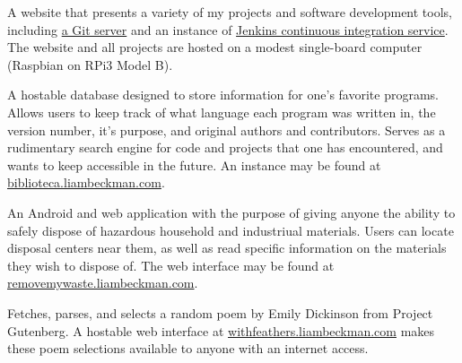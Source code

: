 A website that presents a variety of my projects and software development tools, including \href{https://git.liambeckman.com}{a Git server} and an instance of \href{https://liambeckman.com/jenkins}{Jenkins continuous integration service}. The website and all projects are hosted on a modest single-board computer (Raspbian on RPi3 Model B).

\myBreak


A hostable database designed to store information for one's favorite programs. Allows users to keep track of what language each program was written in, the version number, it’s purpose, and original authors and contributors. Serves as a rudimentary search engine for code and projects that one has encountered, and wants to keep accessible in the future. An instance may be found at \textcolor{my-blue}{\href{https://biblioteca.liambeckman.com}{biblioteca.liambeckman.com}}.

\myBreak


An Android and web application with the purpose of giving anyone the ability to safely dispose of hazardous household and industriual materials. Users can locate disposal centers near them, as well as read specific information on the materials they wish to dispose of. The web interface may be found at \textcolor{my-blue}{\href{https://removemywaste.liambeckman.com}{removemywaste.liambeckman.com}}.

\myBreak


Fetches, parses, and selects a random poem by Emily Dickinson from Project Gutenberg. A hostable web interface at \textcolor{my-blue}{\href{https://withfeathers.liambeckman.com}{withfeathers.liambeckman.com}} makes these poem selections available to anyone with an internet access.

